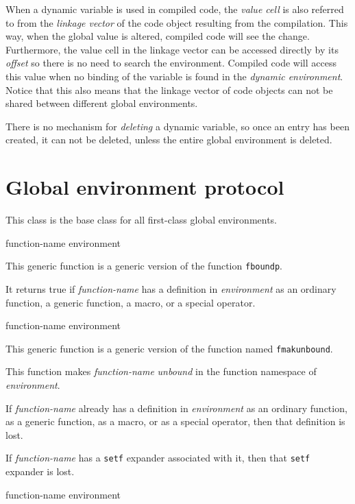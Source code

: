 When a dynamic variable is used in compiled code, the \emph{value
  cell} is also referred to from the \emph{linkage vector} of the code
object resulting from the compilation.  This way, when the global
value is altered, compiled code will see the change.  Furthermore, the
value cell in the linkage vector can be accessed directly by its
\emph{offset} so there is no need to search the environment.  Compiled
code will access this value when no binding of the variable is found
in the \emph{dynamic environment}.  Notice that this also means that
the linkage vector of code objects can not be shared between different
global environments.

There is no mechanism for \emph{deleting} a dynamic variable, so once
an entry has been created, it can not be deleted, unless the entire
global environment is deleted. 

\section{Global environment protocol}
\label{sec-environments-global-environment-protocol}


This class is the base class for all first-class global environments.

 {function-name environment}

This generic function is a generic version of the \commonlisp{}
function \texttt{fboundp}.

It returns true if \textit{function-name} has a definition in
\textit{environment} as an ordinary function, a generic function, a
macro, or a special operator.

 {function-name environment}

This generic function is a generic version of the \commonlisp{}
function named \texttt{fmakunbound}.

This function makes \textit{function-name} \emph{unbound} in the
function namespace of \textit{environment}.

If \textit{function-name} already has a definition in
\textit{environment} as an ordinary function, as a generic function,
as a macro, or as a special operator, then that definition is lost.

If \textit{function-name} has a \texttt{setf} expander associated with
it, then that \texttt{setf} expander is lost.

 {function-name environment}

